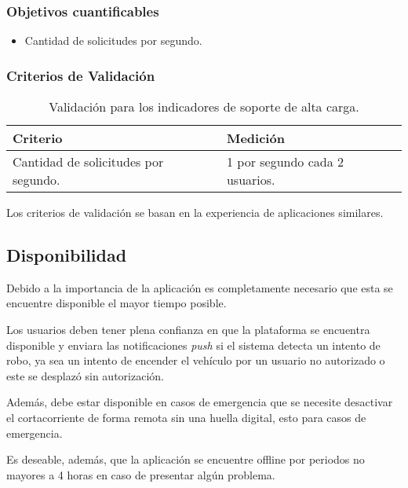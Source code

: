 \subsubsection{Objetivos cuantificables}

\begin{itemize}
	\item
	Cantidad de solicitudes por segundo.
\end{itemize}

\subsubsection{Criterios de Validación}

\begin{table}[H]
    \caption[Validación para los indicadores de soporte de alta carga.] {Validación para los indicadores de soporte de alta carga.}
    \label{tbl:Criterios de Validación soporte de alta carga}
    \begin{tabular}{|p{}|p{}|}
        \hline
        \textbf{Criterio} &  \textbf{Medición}\\
    	\hline
    	\hline
    	Cantidad de solicitudes por segundo.  & 1 por segundo cada 2 usuarios.  \\ \hline
    \end{tabular}
\end{table}
Los criterios de validación se basan en la experiencia de aplicaciones similares.

\subsection{Disponibilidad}

Debido a la importancia de la aplicación es completamente necesario que esta se encuentre disponible el mayor tiempo posible.

Los usuarios deben tener plena confianza en que la plataforma se encuentra disponible y enviara las notificaciones \emph{push} si el sistema detecta un intento de robo, ya sea un intento de encender el vehículo por un usuario no autorizado o este se desplazó sin autorización.

Además, debe estar disponible en casos de emergencia que se necesite desactivar el cortacorriente de forma remota sin una huella digital, esto para casos de emergencia.

Es deseable, además, que la aplicación se encuentre offline por periodos no mayores a 4 horas en caso de presentar algún problema.

